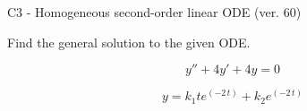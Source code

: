 \begin{exercise}
  \begin{exerciseTitle}C3 - Homogeneous second-order linear ODE (ver. 60)\end{exerciseTitle}
  \begin{exerciseStatement}
    
Find the general solution to the given ODE.

    
\[y''+4y'+4y = 0\]

  \end{exerciseStatement}
  \begin{exerciseAnswer}
    
\[y= k_{1} t e^{\left(-2 \, t\right)} + k_{2} e^{\left(-2 \, t\right)}\]

  \end{exerciseAnswer}
\end{exercise}